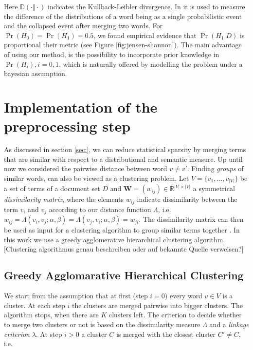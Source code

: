 Here $\mathbb{D}(\cdot \Vert \cdot)$ indicates the Kullback-Leibler divergence. In
\cite{baker1998distributional} it is used to measure the difference of the
distributions of a word being as a single probabilistic event and 
the collapsed event after merging two words. For $\Pr(H_0) = \Pr(H_1) = 0.5$,
we found empirical evidence that $\Pr(H_1|D)$ is proportional their metric (see Figure \ref{fig:jensen-shannon}).
The main advantage of using our method, is the possibility to incorporate prior 
knowledge in $\Pr(H_i), i=0,1$, which is naturally offered by modelling the
problem under a bayesian assumption.

\section{Implementation of the preprocessing step}

As discussed in section \ref{sec:}, we can reduce statistical sparsity
by merging terms that are similar with respect to a distributional and
semantic measure. Up until now we considered the pairwise distance
between word $v \neq v'$. Finding \emph{groups} of similar words, can also be
viewed as a clustering problem.
Let $V = \{v_1,\ldots,v_{|V|}\}$ be a set of terms of a document set $D$ and
$\mathbf{W}=(w_{ij}) \in \mathbb{R}^{|V|\times|V|}$ a symmetrical \emph{dissimilarity matrix}, 
where the elements $w_{ij}$ indicate dissimilarity between the term $v_i$ and
$v_j$ according to our distance function $\Lambda$, i.e.
$w_{ij} = \Lambda(v_i, v_j; \alpha, \beta) = \Lambda(v_j, v_i; \alpha, \beta) =
w_{ji}$. The dissimilarity matrix can then be used as input for a
clustering algorithm to group similar terms together
\cite{baker1998distributional}. In this work we use a greedy agglomerative
hierarchical clustering algorithm. [Clustering algorithmus genau beschreiben oder auf
bekannte Quelle verweisen?]

\subsection{Greedy Agglomarative Hierarchical Clustering}

We start from the assumption that at first (step $i=0$) every word $v \in V$ is
a cluster. At each step $i$ the clusters are merged pairwise into bigger
clusters. The algorithm stops, when there are $K$ clusters left. The criterion
to decide whether to merge two clusters or not is based on the dissimilarity measure 
$\Lambda$ and a \emph{linkage criterion} $\lambda$. At step $i>0$ a 
cluster $C$ is merged with the closest cluster $C' \neq C$, i.e.

